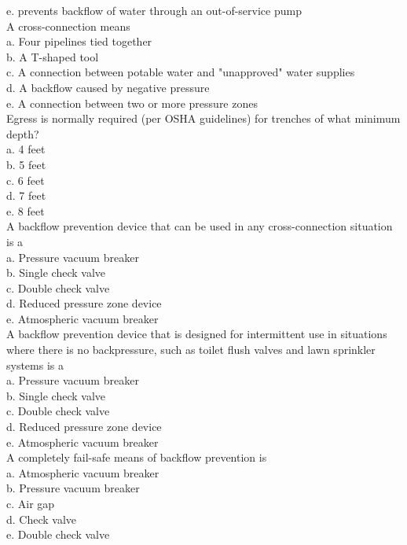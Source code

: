 e. prevents backflow of water through an out-of-service pump\\

A cross-connection means\\
a. Four pipelines tied together\\
b. A T-shaped tool\\
c. A connection between potable water and "unapproved" water supplies\\
d. A backflow caused by negative pressure\\
e. A connection between two or more pressure zones \\

Egress is normally required (per OSHA guidelines) for trenches of what minimum depth?\\
a. 4 feet\\
b. 5 feet\\
c. 6 feet\\
d. 7 feet\\
e. 8 feet\\

A backflow prevention device that can be used in any cross-connection situation is a\\

a. Pressure vacuum breaker\\

b. Single check valve\\

c. Double check valve\\

d. Reduced pressure zone device\\

e. Atmospheric vacuum breaker\\

  A backflow prevention device that is designed for intermittent use in situations where there is no backpressure, such as toilet flush valves and lawn sprinkler systems is a\\
a. Pressure vacuum breaker\\

b. Single check valve\\

c. Double check valve\\

d. Reduced pressure zone device\\

e. Atmospheric vacuum breaker\\


  A completely fail-safe means of backflow prevention is\\
a. Atmospheric vacuum breaker\\
b. Pressure vacuum breaker\\
c. Air gap\\
d. Check valve\\
e. Double check valve

